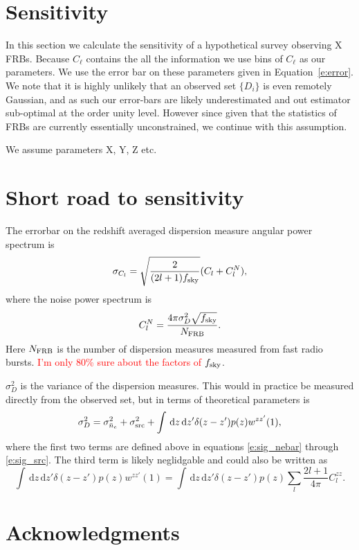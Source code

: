 \documentclass[twocolumn,prd,noshowpacs,nofootinbib,amsmath,amssymb]{revtex4}
\newcommand{\ud}{\,\mathrm{d}}
\newcommand{\red}{\textcolor{red}}
\begin{document}
\section{Sensitivity}

In this section we calculate the sensitivity of a hypothetical survey observing
X FRBs. Because $C_\ell$ contains the all the information we use bins
of $C_\ell$ as our parameters. We use the error bar on these parameters given
in Equation~\ref{e:error}.  We note that it is highly unlikely that an observed
set $\{D_i\}$ is even remotely Gaussian, and as such our error-bars are likely
underestimated and out estimator sub-optimal at the order unity level. 
However since given that the statistics of FRBs are currently essentially
unconstrained, we continue with this assumption.

We assume parameters X, Y, Z etc.

\section{Short road to sensitivity}

The errorbar on the redshift averaged dispersion measure angular power spectrum
is
\begin{equation}
    \sigma_{C_l} = \sqrt{\frac{2}{(2 l + 1) f_{\rm sky}}} (C_l + C^N_l),
\end{equation}
where the noise power spectrum is
\begin{equation}
    C^N_l = \frac{4 \pi \sigma_D^2 \sqrt{f_{\rm sky}}}{N_{\rm FRB}}.
\end{equation}
Here $N_{\rm FRB}$ is the number of dispersion measures measured from fast
radio bursts. \red{I'm only 80\% sure about the factors of $f_{\rm sky}$}.

$\sigma_D^2$ is the variance of the dispersion measures.  This would in
practice be measured directly from the observed set, but in terms of
theoretical parameters is
\begin{equation}
\sigma_D^2 = \sigma_{\bar{n}_e}^2 + \sigma^2_{\rm src} + \int \ud z \ud z'
\delta(z - z') p(z) w^{z z'}(1),
\end{equation}
where the first two terms are defined above in equations \ref{e:sig_nebar}
through
\ref{e:sig_src}. The third term is likely
neglidgable and could also be written as
\begin{equation}
    \int \ud z \ud z' \delta(z - z') p(z) w^{z z'}(1) = \int \ud z \ud z'
    \delta(z - z') p(z) \sum_{l} \frac{2l+1}{4\pi} C_l^{zz}.
\end{equation}



\bigskip
\section*{Acknowledgments}
\medskip

 


\end{document}
